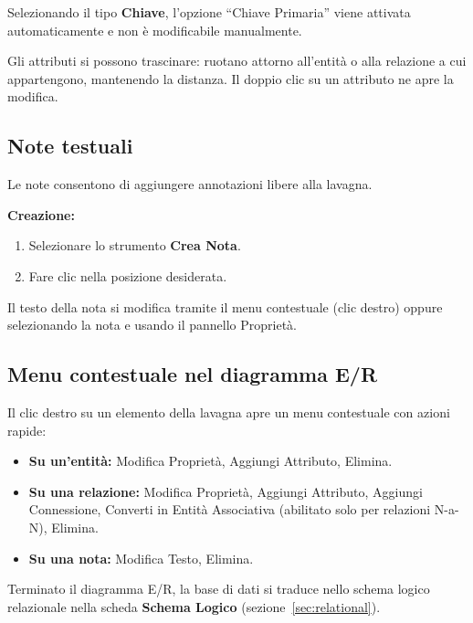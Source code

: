 \documentclass[a4paper,11pt]{article}
\newcommand{\uielement}[1]{\textbf{#1}}
\begin{document}
\begin{tcolorbox}[notebox, title={Nota}]
  Selezionando il tipo \textbf{Chiave}, l'opzione ``Chiave Primaria'' viene attivata
  automaticamente e non è modificabile manualmente.
\end{tcolorbox}

Gli attributi si possono trascinare: ruotano attorno all'entità o alla relazione a cui
appartengono, mantenendo la distanza. Il doppio clic su un attributo ne apre la modifica.

\subsection{Note testuali}

Le note consentono di aggiungere annotazioni libere alla lavagna.

\textbf{Creazione:}
\begin{enumerate}
  \item Selezionare lo strumento \uielement{Crea Nota}.
  \item Fare clic nella posizione desiderata.
\end{enumerate}

Il testo della nota si modifica tramite il menu contestuale (clic destro) oppure
selezionando la nota e usando il pannello Proprietà.

\subsection{Menu contestuale nel diagramma E/R}

Il clic destro su un elemento della lavagna apre un menu contestuale con azioni rapide:

\begin{itemize}
  \item \textbf{Su un'entità:} Modifica Proprietà, Aggiungi Attributo, Elimina.
  \item \textbf{Su una relazione:} Modifica Proprietà, Aggiungi Attributo, Aggiungi Connessione,
        Converti in Entità Associativa (abilitato solo per relazioni N-a-N), Elimina.
  \item \textbf{Su una nota:} Modifica Testo, Elimina.
\end{itemize}

\begin{tcolorbox}[tipbox, title={Il passo successivo}]
  Terminato il diagramma E/R, la base di dati si traduce nello schema logico relazionale nella
  scheda \uielement{Schema Logico} (sezione~\ref{sec:relational}).
\end{tcolorbox}
\end{document}
